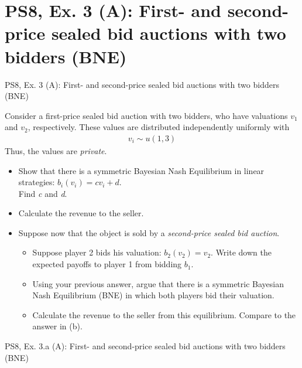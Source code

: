 \section{PS8, Ex. 3 (A): First- and second-price sealed bid auctions with two bidders (BNE)}

\begin{frame}{PS8, Ex. 3 (A): First- and second-price sealed bid auctions with two bidders (BNE)}
  \begin{multicols}{2}
    Consider a first-price sealed bid auction with two bidders, who have valuations $v_1$ and $v_2$, respectively. These values are distributed independently uniformly with
    \begin{align*}
      v_i\sim u(1,3)
    \end{align*}
    Thus, the values are \textit{private}.
    \begin{itemize}
      \item[(a)] Show that there is a symmetric Bayesian Nash Equilibrium in linear strategies: $b_i(v_i) = cv_i + d$.\\
                 Find \textit{c} and \textit{d}.
      \item[(b)] Calculate the revenue to the seller.
    \end{itemize}
    \vfill\null\columnbreak
    \begin{itemize}
      \item[(c)] Suppose now that the object is sold by a \textit{second-price sealed bid auction}.
      \begin{itemize}\normalsize
        \item[i.]   Suppose player 2 bids his valuation: $b_2(v_2) = v_2$. Write down the expected payoffs to player 1 from bidding $b_1$.
        \item[ii.]  Using your previous answer, argue that there is a symmetric Bayesian Nash Equilibrium (BNE) in which both players bid their valuation.
        \item[iii.] Calculate the revenue to the seller from this equilibrium. Compare to the answer in (b).
      \end{itemize}
    \end{itemize}
    \vfill\null
  \end{multicols}
\end{frame}

\begin{frame}{PS8, Ex. 3.a (A): First- and second-price sealed bid auctions with two bidders (BNE)}
  \begin{multicols}{2}
    \vfill\null\columnbreak
    \vfill\null
  \end{multicols}
\end{frame}



